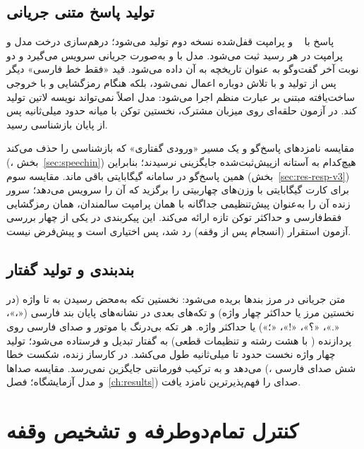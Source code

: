\subsection{تولید پاسخ متنی جریانی}

پاسخ با ~\cite{qwen2025qwen3} و پرامپت قفل‌شده
نسخه دوم تولید می‌شود؛ درهم‌سازی درخت مدل و پرامپت در هر رسید ثبت می‌شود.
مدل با  و به‌صورت جریانی سرویس می‌گیرد و دو نوبت آخر گفت‌وگو به
عنوان تاریخچه به آن داده می‌شود. قید «فقط خط فارسی» دیگر پس از تولید و با
تلاش دوباره اعمال نمی‌شود، بلکه هنگام رمزگشایی و با خروجی ساخت‌یافته مبتنی بر
عبارت منظم اجرا می‌شود: مدل اصلاً نمی‌تواند نویسه لاتین تولید کند. در آزمون
حلقه‌ای روی میزبان مشترک، نخستین توکن با میانه حدود  میلی‌ثانیه پس از پایان
بازشناسی رسید.

مقایسه نامزدهای پاسخ‌گو و یک مسیر «ورودی گفتاری» که بازشناسی را حذف
می‌کند (، بخش~\ref{sec:speechin}) هیچ‌کدام به آستانه
ازپیش‌ثبت‌شده جایگزینی نرسیدند؛ بنابراین همین پاسخ‌گو در سامانه  گیگابایتی
باقی ماند. مقایسه سوم (بخش~\ref{sec:res-resp-v3}) برای کارت  گیگابایتی
 با وزن‌های چهاربیتی  را برگزید که  آن را
سرویس می‌دهد؛ سرور زنده آن را به‌عنوان پیش‌تنظیمی جداگانه با همان پرامپت سالمندان،
همان رمزگشایی فقط‌فارسی و حداکثر  توکن تازه ارائه می‌کند. این پیکربندی
در یکی از چهار بررسی آزمون استقرار (انسجام پس از وقفه) رد شد، پس اختیاری است و
پیش‌فرض نیست.

\subsection{بندبندی و تولید گفتار}

متن جریانی در مرز بندها بریده می‌شود: نخستین تکه به‌محض رسیدن به
 تا  واژه (در نخستین مرز یا حداکثر چهار واژه) و تکه‌های بعدی در
نشانه‌های پایان بند فارسی («،»، «.»، «؟»، «!»، «؛») یا حداکثر 
واژه. هر تکه بی‌درنگ با موتور  و صدای فارسی  روی پردازنده
( با هشت رشته و تنظیمات قطعی) به گفتار تبدیل و فرستاده
می‌شود؛ تولید چهار واژه نخست حدود  تا  میلی‌ثانیه طول می‌کشد.
در کارساز زنده، شکست  خطا می‌دهد و به ترکیب فورمانتی جایگزین
نمی‌رسد. مقایسه صداها (شش صدای فارسی ،  و مدل
 آزمایشگاه؛ فصل~\ref{ch:results}) صدای  را فهم‌پذیرترین
نامزد یافت.

\section{کنترل تمام‌دوطرفه و تشخیص وقفه}
\label{sec:bargein}


